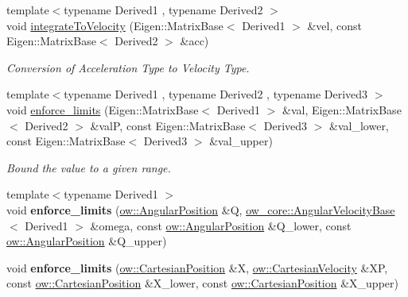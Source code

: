 \begin{DoxyCompactItemize}
{\footnotesize template$<$typename Derived1 , typename Derived2 $>$ }\\void \hyperlink{classow__core_1_1StateIntegrator_a6e0851c46dbf7a4160ff9b8e1f4f79d8}{integrate\+To\+Velocity} (Eigen\+::\+Matrix\+Base$<$ Derived1 $>$ \&vel, const Eigen\+::\+Matrix\+Base$<$ Derived2 $>$ \&acc)
\begin{DoxyCompactList}\small\item\em Conversion of Acceleration Type to Velocity Type. \end{DoxyCompactList}\item 
{\footnotesize template$<$typename Derived1 , typename Derived2 , typename Derived3 $>$ }\\void \hyperlink{classow__core_1_1StateIntegrator_a3ae4ec452350ba28146fed0c2f4f31eb}{enforce\+\_\+limits} (Eigen\+::\+Matrix\+Base$<$ Derived1 $>$ \&val, Eigen\+::\+Matrix\+Base$<$ Derived2 $>$ \&valP, const Eigen\+::\+Matrix\+Base$<$ Derived3 $>$ \&val\+\_\+lower, const Eigen\+::\+Matrix\+Base$<$ Derived3 $>$ \&val\+\_\+upper)
\begin{DoxyCompactList}\small\item\em Bound the value to a given range. \end{DoxyCompactList}\item 
{\footnotesize template$<$typename Derived1 $>$ }\\void {\bfseries enforce\+\_\+limits} (\hyperlink{classow__core_1_1AngularPosition}{ow\+::\+Angular\+Position} \&Q, \hyperlink{classow__core_1_1AngularVelocityBase}{ow\+\_\+core\+::\+Angular\+Velocity\+Base}$<$ Derived1 $>$ \&omega, const \hyperlink{classow__core_1_1AngularPosition}{ow\+::\+Angular\+Position} \&Q\+\_\+lower, const \hyperlink{classow__core_1_1AngularPosition}{ow\+::\+Angular\+Position} \&Q\+\_\+upper)\hypertarget{classow__core_1_1StateIntegrator_a482140d22c98deb50c49000562a9e4bf}{}\label{classow__core_1_1StateIntegrator_a482140d22c98deb50c49000562a9e4bf}

\item 
void {\bfseries enforce\+\_\+limits} (\hyperlink{classow__core_1_1CartesianPosition}{ow\+::\+Cartesian\+Position} \&X, \hyperlink{classow__core_1_1CartesianVelocity}{ow\+::\+Cartesian\+Velocity} \&XP, const \hyperlink{classow__core_1_1CartesianPosition}{ow\+::\+Cartesian\+Position} \&X\+\_\+lower, const \hyperlink{classow__core_1_1CartesianPosition}{ow\+::\+Cartesian\+Position} \&X\+\_\+upper)\hypertarget{classow__core_1_1StateIntegrator_a00e03fe3b6159d730f8c49d1aca2ae8f}{}\label{classow__core_1_1StateIntegrator_a00e03fe3b6159d730f8c49d1aca2ae8f}

\end{DoxyCompactItemize}
